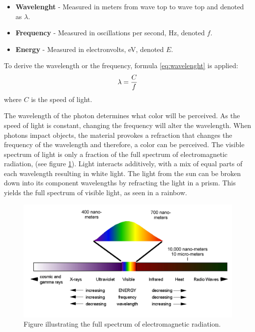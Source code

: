\begin{itemize}
\item \textbf{Wavelenght} - Measured in meters from wave top to wave top and denoted as $\lambda$.
\item \textbf{Frequency} - Measured in oscillations per second, Hz, denoted $f$.
\item \textbf{Energy} - Measured in electronvolts, eV, denoted $E$.
\end{itemize}

To derive the wavelength or the frequency, formula \ref{eq:wavelenght} is applied:
\begin{align}
\centering 
\lambda = \frac{C}{f}
\label{eq:wavelenght} 
\end{align}
where {$C$} is the speed of light.

The wavelength of the photon determines what color will be perceived. As the speed of light is constant, changing the frequency will alter the wavelength. When photons impact objects, the material provokes a refraction that changes the frequency of the wavelength and therefore, a color can be perceived. The visible spectrum of light is only a fraction of the full spectrum of electromagnetic radiation, (see figure \ref{fig:em_rad}). Light interacts additively, with a mix of equal parts of each wavelength resulting in white light. The light from the sun can be broken down into its component wavelengths by refracting the light in a prism. This yields the full spectrum of visible light, as seen in a rainbow.

\begin{figure}[htbp] 
\centering 
\includegraphics[width=1\textwidth]{Pictures/Theory/em_rad.png} 
\caption{Figure illustrating the full spectrum of electromagnetic radiation.} 
\label{fig:em_rad} 
\end{figure}

